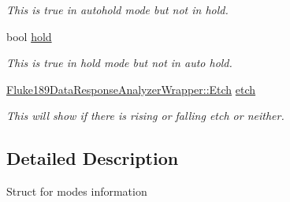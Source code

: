 \begin{DoxyCompactItemize}
\begin{DoxyCompactList}\small\item\em This is true in autohold mode but not in hold. \item\end{DoxyCompactList}\item 
\hypertarget{structFluke_1_1Fluke189QD0Logging_1_1modes__t_ac7a9e6524803a4745e96dc623d53b0f5}{
bool \hyperlink{structFluke_1_1Fluke189QD0Logging_1_1modes__t_ac7a9e6524803a4745e96dc623d53b0f5}{hold}}
\label{structFluke_1_1Fluke189QD0Logging_1_1modes__t_ac7a9e6524803a4745e96dc623d53b0f5}

\begin{DoxyCompactList}\small\item\em This is true in hold mode but not in auto hold. \item\end{DoxyCompactList}\item 
\hypertarget{structFluke_1_1Fluke189QD0Logging_1_1modes__t_acca68d7c475c2a01f6aec4a76148f117}{
\hyperlink{classFluke_1_1Fluke189DataResponseAnalyzerWrapper_ada71f6ab32a7b0eb40bb0ed96d7053bc}{Fluke189DataResponseAnalyzerWrapper::Etch} \hyperlink{structFluke_1_1Fluke189QD0Logging_1_1modes__t_acca68d7c475c2a01f6aec4a76148f117}{etch}}
\label{structFluke_1_1Fluke189QD0Logging_1_1modes__t_acca68d7c475c2a01f6aec4a76148f117}

\begin{DoxyCompactList}\small\item\em This will show if there is rising or falling etch or neither. \item\end{DoxyCompactList}\end{DoxyCompactItemize}


\subsection{Detailed Description}
Struct for modes information 

